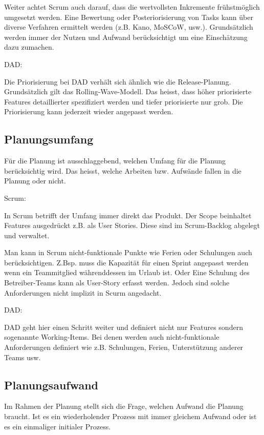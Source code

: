Weiter achtet Scrum auch darauf, dass die wertvollsten Inkremente frühstmöglich umgesetzt werden. Eine Bewertung oder Posteriorisierung von Tasks kann über diverse Verfahren ermittelt werden (z.B. Kano, MoSCoW, usw.). Grundsätzlich werden immer der Nutzen und Aufwand berücksichtigt um eine Einschätzung dazu zumachen. \bigskip 

{\Large DAD:} \cite{planningPrioDad} \medskip

Die Priorisierung bei DAD verhält sich ähnlich wie die Release-Planung. Grundsätzlich gilt das Rolling-Wave-Modell. Das heisst, dass höher priorisierte Features detaillierter spezifiziert werden und tiefer priorisierte nur grob. Die Priorisierung kann jederzeit wieder angepasst werden.


\subsection{Planungsumfang}

Für die Planung ist ausschlaggebend, welchen Umfang für die Planung berücksichtig wird. Das heisst, welche Arbeiten bzw. Aufwände fallen in die Planung oder nicht.

{\Large Scrum:} \medskip

In Scrum betrifft der Umfang immer direkt das Produkt. Der Scope beinhaltet Features ausgedrückt z.B. als User Stories. Diese sind im Scrum-Backlog abgelegt und verwaltet.\medskip

Man kann in Scrum nicht-funktionale Punkte wie Ferien oder Schulungen auch berücksichtigen. Z.Bsp. muss die Kapazität für einen Sprint angepasst werden wenn ein Teammitglied währenddessen im Urlaub ist. Oder Eine Schulung des Betreiber-Teams kann als User-Story erfasst werden. Jedoch sind solche Anforderungen nicht implizit in Scurm angedacht.	
\bigskip 

{\Large DAD:} \cite{planningScopeDad} \medskip

DAD geht hier einen Schritt weiter und definiert nicht nur Features sondern sogenannte Working-Items. Bei denen werden auch nicht-funktionale Anforderungen definiert wie z.B. Schulungen, Ferien, Unterstützung anderer Teams usw.	


\subsection{Planungsaufwand}

Im Rahmen der Planung stellt sich die Frage, welchen Aufwand die Planung braucht. Ist es ein wiederholender Prozess mit immer gleichem Aufwand oder ist es ein einmaliger initialer Prozess.

